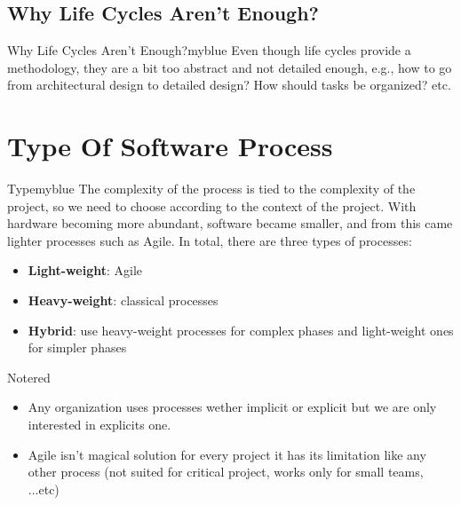 \documentclass{report}
\begin{document}
\vspace{0.15cm}

\subsection{Why Life Cycles Aren't Enough?}
\begin{prettyBox}{Why Life Cycles Aren't Enough?}{myblue}
    Even though life cycles provide a methodology, they are a bit too abstract and not detailed enough, e.g., how to go from architectural design 
    to detailed design? How should tasks be organized? etc.
\end{prettyBox}

\vspace{0.15cm}

\section{Type Of Software Process}
\begin{prettyBox}{Type}{myblue}
    The complexity of the process is tied to the complexity of the project, so we need to choose according to the context of the project. With
    hardware becoming more abundant, software became smaller, and from this came lighter processes such as Agile. In total, there are three types of processes:

    \begin{itemize}
        \itemsep0em 
        \item \textbf{Light-weight}: Agile
        \item \textbf{Heavy-weight}: classical processes
        \item \textbf{Hybrid}: use heavy-weight processes for complex phases and light-weight ones for simpler phases
    \end{itemize}
\end{prettyBox}


\begin{prettyBox}{Note}{red}
    \begin{itemize}
        \itemsep0em 
        \item Any organization uses processes wether implicit or explicit but we are only interested in explicits one. 
        \item Agile isn't magical solution for every project it has its limitation like any other process (not suited for critical project, works only
            for small teams, ...etc)
    \end{itemize}
\end{prettyBox}
\end{document}
